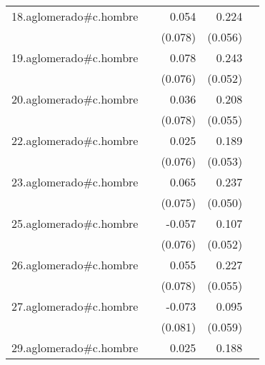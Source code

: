 {\begin{longtable}{l*{4}{D{.}{.}{-1}}}
\addlinespace
18.aglomerado#c.hombre&                     &       0.054         &       0.224\sym{***}&                     \\
            &                     &     (0.078)         &     (0.056)         &                     \\
\addlinespace
19.aglomerado#c.hombre&                     &       0.078         &       0.243\sym{***}&                     \\
            &                     &     (0.076)         &     (0.052)         &                     \\
\addlinespace
20.aglomerado#c.hombre&                     &       0.036         &       0.208\sym{***}&                     \\
            &                     &     (0.078)         &     (0.055)         &                     \\
\addlinespace
22.aglomerado#c.hombre&                     &       0.025         &       0.189\sym{***}&                     \\
            &                     &     (0.076)         &     (0.053)         &                     \\
\addlinespace
23.aglomerado#c.hombre&                     &       0.065         &       0.237\sym{***}&                     \\
            &                     &     (0.075)         &     (0.050)         &                     \\
\addlinespace
25.aglomerado#c.hombre&                     &      -0.057         &       0.107\sym{*}  &                     \\
            &                     &     (0.076)         &     (0.052)         &                     \\
\addlinespace
26.aglomerado#c.hombre&                     &       0.055         &       0.227\sym{***}&                     \\
            &                     &     (0.078)         &     (0.055)         &                     \\
\addlinespace
27.aglomerado#c.hombre&                     &      -0.073         &       0.095         &                     \\
            &                     &     (0.081)         &     (0.059)         &                     \\
\addlinespace
29.aglomerado#c.hombre&                     &       0.025         &       0.188\sym{***}&                     \\

\end{longtable}}
